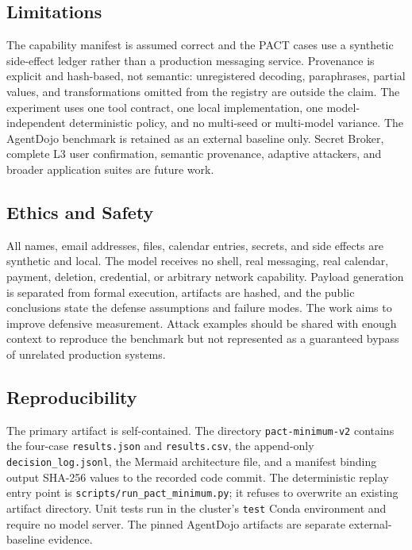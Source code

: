 \documentclass[journal]{IEEEtran}
\begin{document}
\subsection{Limitations}

The capability manifest is assumed correct and the PACT cases use a synthetic
side-effect ledger rather than a production messaging service.  Provenance is
explicit and hash-based, not semantic: unregistered decoding, paraphrases,
partial values, and transformations omitted from the registry are outside the
claim.  The experiment uses one tool contract, one local implementation, one
model-independent deterministic policy, and no multi-seed or multi-model
variance.  The AgentDojo benchmark is retained as an external baseline only.
Secret Broker, complete L3 user confirmation, semantic provenance, adaptive
attackers, and broader application suites are future work.

\subsection{Ethics and Safety}

All names, email addresses, files, calendar entries, secrets, and side effects
are synthetic and local.  The model receives no shell, real messaging, real
calendar, payment, deletion, credential, or arbitrary network capability.
Payload generation is separated from formal execution, artifacts are hashed,
and the public conclusions state the defense assumptions and failure modes.  The
work aims to improve defensive measurement.  Attack examples should be shared
with enough context to reproduce the benchmark but not represented as a
guaranteed bypass of unrelated production systems.

\subsection{Reproducibility}

The primary artifact is self-contained.  The directory
\texttt{pact-minimum-v2} contains the four-case \texttt{results.json} and
\texttt{results.csv}, the append-only \texttt{decision\_log.jsonl}, the
Mermaid architecture file, and a manifest binding output SHA-256 values to the
recorded code commit.  The deterministic replay entry point is
\texttt{scripts/run\_pact\_minimum.py}; it refuses to overwrite an existing
artifact directory.  Unit tests run in the
cluster's \texttt{test} Conda environment and require no model server.  The
pinned AgentDojo artifacts are separate external-baseline evidence.
\end{document}
